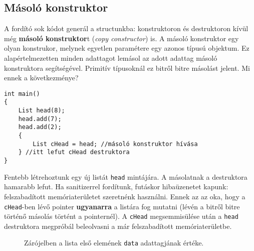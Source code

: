 \documentclass[a4paper,11.5pt,table]{article}
\begin{document}
	\subsection{Másoló konstruktor}
	
	A fordító sok kódot generál a structunkba: konstruktoron és destruktoron kívül még \textbf{másoló konstruktor}t (\textit{copy constructor}) is. A másoló konstruktor egy olyan konstrukor, melynek egyetlen paramétere egy azonos típusú objektum. Ez alapértelmezetten minden adattagot lemásol az adott adattag másoló konstruktora segítségével. Primitív típusoknál ez bitről bitre másolást jelent. Mi ennek a következménye?
	\begin{lstlisting}
int main()
{
	List head(8);
	head.add(7);
	head.add(2);
	{
		List cHead = head; //másoló konstruktor hívása
	} //itt lefut cHead destruktora
}
	\end{lstlisting}
	Fentebb létrehoztunk egy új listát \texttt{head} mintájára. A másolatnak a destruktora hamarabb lefut. Ha sanitizerrel fordítunk, futáskor hibaüzenetet kapunk: felszabadított memóriaterületet szeretnénk használni. Ennek az az oka, hogy a \texttt{cHead}-ben lévő pointer \textbf{ugyanarra} a listára fog mutatni (lévén a bitről bitre történő másolás történt a pointernél). A \texttt{cHead} megsemmisülése után a \texttt{head} destruktora megpróbál beleolvasni a már felszabadított memóriaterületbe.
	
	\begin{figure}[!h]
		\centering
		\smallskip
		
		Zárójelben a lista első elemének \texttt{data} adattagjának értéke.
	\end{figure}
	
\end{document}
